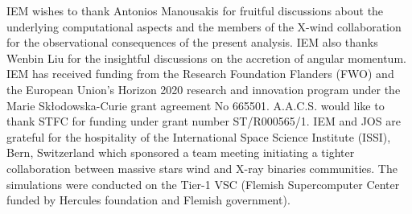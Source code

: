\documentclass{aa}
\begin{document}
%
%
%


\begin{acknowledgements}
IEM wishes to thank Antonios Manousakis for fruitful discussions about the underlying computational aspects and the members of the X-wind collaboration for the observational consequences of the present analysis. IEM also thanks Wenbin Liu for the insightful discussions on the accretion of angular momentum. IEM has received funding from the Research Foundation Flanders (FWO) and the European Union's Horizon 2020 research and innovation program under the Marie Sk\l odowska-Curie grant agreement No 665501. A.A.C.S. would like to thank STFC for funding under grant number ST/R000565/1. IEM and JOS are grateful for the hospitality of the International Space Science Institute (ISSI), Bern, Switzerland which sponsored a team meeting initiating a tighter collaboration between massive stars wind and X-ray binaries communities. The simulations were conducted on the Tier-1 VSC (Flemish Supercomputer Center funded by Hercules foundation and Flemish government).
\end{acknowledgements}



\begin{tiny}

\end{tiny}
\end{document}

